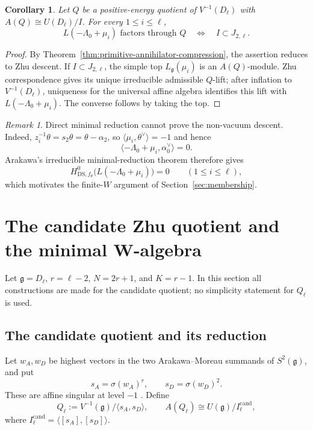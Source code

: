 \documentclass[11pt]{amsart}
\newtheorem{corollary}[theorem]{Corollary}
\theoremstyle{remark}
\newtheorem{remark}[theorem]{Remark}
\numberwithin{equation}{section}
\begin{document}
\begin{corollary}
\label{cor:single-membership-test}
Let \(Q\) be a positive-energy quotient of \(V^{-1}(D_\ell)\) with
\(A(Q)\cong U(D_\ell)/I\).  For every \(1\le i\le\ell\),
\[
   L(-\Lambda_0+\mu_i)\text{ factors through }Q
   \quad\Longleftrightarrow\quad
   I\subset J_{2,\ell}.
\]
\end{corollary}

\begin{proof}
By Theorem~\ref{thm:primitive-annihilator-compression}, the assertion
reduces to Zhu descent.  If \(I\subset J_{2,\ell}\), the simple top
\(L_{\mathfrak g}(\mu_i)\) is an \(A(Q)\)-module.  Zhu correspondence
\cite[Theorem~4.9]{DongLiMason1998} gives its unique irreducible admissible
\(Q\)-lift; after inflation to \(V^{-1}(D_\ell)\), uniqueness for the
universal affine algebra identifies this lift with
\(L(-\Lambda_0+\mu_i)\).  The converse follows by taking the top.
\end{proof}

\begin{remark}
Direct minimal reduction cannot prove the non-vacuum descent.  Indeed,
\(z_i^{-1}\theta=s_2\theta=\theta-\alpha_2\), so
\(\langle\mu_i,\theta^\vee\rangle=-1\) and hence
\[
   \langle-\Lambda_0+\mu_i,\alpha_0^\vee\rangle=0.
\]
Arakawa's irreducible minimal-reduction theorem
\cite[Theorem~6.7.4]{Arakawa2005} therefore gives
\[
   H^0_{\mathrm{DS},f_\theta}\bigl(L(-\Lambda_0+\mu_i)\bigr)=0
   \qquad(1\le i\le\ell),
\]
which motivates the finite-\(W\) argument of Section~\ref{sec:membership}.
\end{remark}
\section{The candidate Zhu quotient and the minimal W-algebra}
\label{sec:candidate-zhu-minimalW}

Let \(\mathfrak g=D_\ell\), \(r=\ell-2\), \(N=2r+1\), and
\(K=r-1\).  In this section all constructions are made for the candidate
quotient; no simplicity statement for \(Q_\ell\) is used.

\subsection{The candidate quotient and its reduction}

Let \(w_A,w_D\) be highest vectors in the two Arakawa--Moreau summands of
\(S^2(\mathfrak g)\), and put
\[
   s_A=\sigma(w_A)^r,
   \qquad
   s_D=\sigma(w_D)^2.
\]
These are affine singular at level \(-1\)
\cite[Theorem~4.2]{ArakawaMoreau2018}.  Define
\begin{equation}
   Q_\ell:=V^{-1}(\mathfrak g)/\langle s_A,s_D\rangle,
   \qquad
   A(Q_\ell)\cong U(\mathfrak g)/I_\ell^{\mathrm{cand}},
\end{equation}
where \(I_\ell^{\mathrm{cand}}=\langle[s_A],[s_D]\rangle\).
\end{document}
